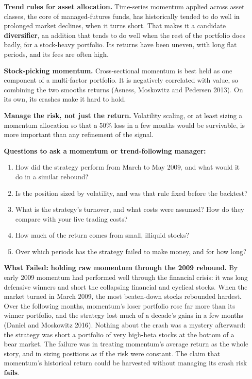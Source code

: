 \textbf{Trend rules for asset allocation.} Time-series momentum applied across asset classes, the core of managed-futures funds, has historically tended to do well in prolonged market declines, when it turns short. That makes it a candidate \textbf{diversifier}, an addition that tends to do well when the rest of the portfolio does badly, for a stock-heavy portfolio. Its returns have been uneven, with long flat periods, and its fees are often high.

\textbf{Stock-picking momentum.} Cross-sectional momentum is best held as one component of a multi-factor portfolio. It is negatively correlated with value, so combining the two smooths returns (Asness, Moskowitz and Pedersen 2013). On its own, its crashes make it hard to hold.

\textbf{Manage the risk, not just the return.} Volatility scaling, or at least sizing a momentum allocation so that a 50\% loss in a few months would be survivable, is more important than any refinement of the signal.

\textbf{Questions to ask a momentum or trend-following manager:}

\begin{enumerate}
  \item How did the strategy perform from March to May 2009, and what would it do in a similar rebound?
  \item Is the position sized by volatility, and was that rule fixed before the backtest?
  \item What is the strategy's turnover, and what costs were assumed? How do they compare with your live trading costs?
  \item How much of the return comes from small, illiquid stocks?
  \item Over which periods has the strategy failed to make money, and for how long?
\end{enumerate}

\begin{callout}
\textbf{What Failed: holding raw momentum through the 2009 rebound.} By early 2009 momentum had performed well through the financial crisis: it was long defensive winners and short the collapsing financial and cyclical stocks. When the market turned in March 2009, the most beaten-down stocks rebounded hardest. Over the following months, momentum's loser portfolio rose far more than its winner portfolio, and the strategy lost much of a decade's gains in a few months (Daniel and Moskowitz 2016). Nothing about the crash was a mystery afterward: the strategy was short a portfolio of very high-beta stocks at the bottom of a bear market. The failure was in treating momentum's average return as the whole story, and in sizing positions as if the risk were constant. The claim that momentum's historical return could be harvested without managing its crash risk \textbf{fails}.
\end{callout}

